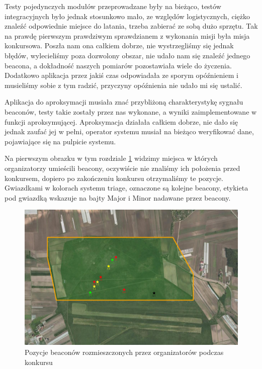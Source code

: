 Testy pojedynczych modułów przeprowadzane były na bieżąco, testów integracyjnych było jednak stosunkowo mało, ze względów logistycznych, ciężko znaleźć odpowiednie miejsce do latania, trzeba zabierać ze sobą dużo sprzętu. Tak na prawdę pierwszym prawdziwym sprawdzianem z wykonania misji była misja konkursowa. Poszła nam ona całkiem dobrze, nie wystrzegliśmy się jednak błędów, wylecieliśmy poza dozwolony obszar, nie udało nam się znaleźć jednego beacona, a dokładność naszych pomiarów pozostawiała wiele do życzenia. Dodatkowo aplikacja przez jakiś czas odpowiadała ze sporym opóźnieniem i musieliśmy sobie z tym radzić, przyczyny opóźnienia nie udało mi się ustalić. 

Aplikacja do aproksymacji musiała znać przybliżoną charakterystykę sygnału beaconów, testy takie zostały przez nas wykonane, a wyniki zaimplementowane w funkcji aproksymującej. Aproksymacja działała całkiem dobrze, nie dało się jednak zaufać jej w pełni, operator systemu musiał na bieżąco weryfikować dane, pojawiające się na pulpicie systemu.

Na pierwszym obrazku w tym rozdziale \ref{fig:beaconykonkursowe} widzimy miejsca w których organizatorzy umieścili beacony, oczywiście nie znaliśmy ich położenia przed konkursem, dopiero po zakończeniu konkursu otrzymaliśmy te pozycje. Gwiazdkami w kolorach systemu triage, oznaczone są kolejne beacony, etykieta pod gwiazdką wskazuje na bajty Major i Minor nadawane przez beacony.

\begin{figure}[!th]
    \centering
    \includegraphics[width=15cm]{zalaczniki/obrazy/beacony_konkursowe.png}
    \caption{Pozycje beaconów rozmieszczonych przez organizatorów podczas konkursu}
    \label{fig:beaconykonkursowe}
\end{figure}

